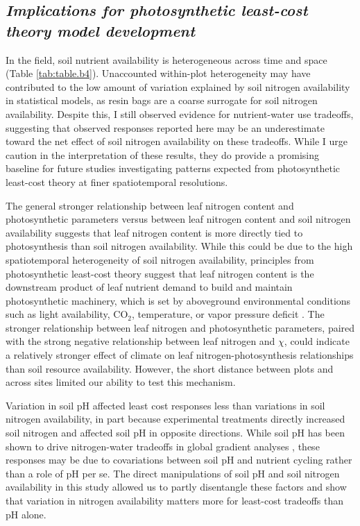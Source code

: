 \subsection{\textit{Implications for photosynthetic least-cost theory model development}}
\noindent In the field, soil nutrient availability is heterogeneous across time and space (Table \ref{tab:table.b4}). Unaccounted within-plot heterogeneity may have contributed to the low amount of variation explained by soil nitrogen availability in statistical models, as resin bags are a coarse surrogate for soil nitrogen availability. Despite this, I still observed evidence for nutrient-water use tradeoffs, suggesting that observed responses reported here may be an underestimate toward the net effect of soil nitrogen availability on these tradeoffs. While I urge caution in the interpretation of these results, they do provide a promising baseline for future studies investigating patterns expected from photosynthetic least-cost theory at finer spatiotemporal resolutions.
    
The general stronger relationship between leaf nitrogen content and photosynthetic parameters versus between leaf nitrogen content and soil nitrogen availability suggests that leaf nitrogen content is more directly tied to photosynthesis than soil nitrogen availability. While this could be due to the high spatiotemporal heterogeneity of soil nitrogen availability, principles from photosynthetic least-cost theory suggest that leaf nitrogen content is the downstream product of leaf nutrient demand to build and maintain photosynthetic machinery, which is set by aboveground environmental conditions such as light availability, CO$_2$, temperature, or vapor pressure deficit . The stronger relationship between leaf nitrogen and photosynthetic parameters, paired with the strong negative relationship between leaf nitrogen and $\chi$, could indicate a relatively stronger effect of climate on leaf nitrogen-photosynthesis relationships than soil resource availability. However, the short distance between plots and across sites limited our ability to test this mechanism.
    
Variation in soil pH affected least cost responses less than variations in soil nitrogen availability, in part because experimental treatments directly increased soil nitrogen and affected soil pH in opposite directions. While soil pH has been shown to drive nitrogen-water tradeoffs in global gradient analyses , these responses may be due to covariations between soil pH and nutrient cycling rather than a role of pH per se. The direct manipulations of soil pH and soil nitrogen availability in this study allowed us to partly disentangle these factors and show that variation in nitrogen availability matters more for least-cost tradeoffs than pH alone.

